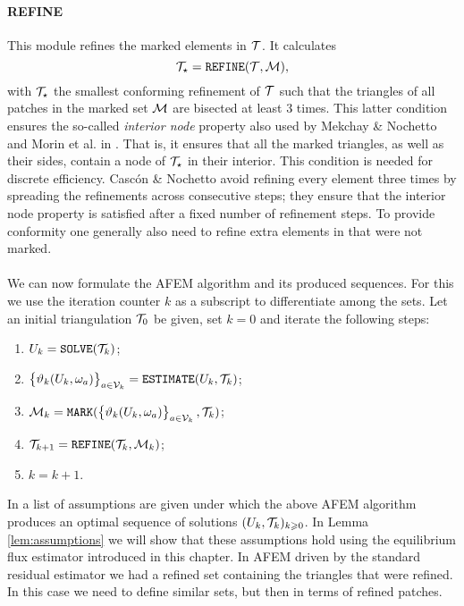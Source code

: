 \documentclass[thesis.tex]{subfiles}
\begin{document}
\paragraph{REFINE}
This module refines the marked elements in $\mathcal{T}$. It calculates
\[
  \mathcal{T}_\star = \texttt{REFINE}(\mathcal{T}, \mathcal{M}),
\]
with $\mathcal{T}_\star$ the smallest conforming refinement of $\mathcal{T}$ such that the triangles of
all patches in the marked set $\mathcal{M}$ are bisected at least 3 times. 
This latter condition ensures the so-called \emph{interior node} property also used by Mekchay \& Nochetto \cite{mekchay2005convergence} and Morin et al. in \cite{morin2002convergence}. That is, it ensures that all the marked triangles, as well as their sides, contain a node of $\mathcal{T}_\star$ in their interior.
This condition is needed for  discrete efficiency. Casc\'on \& Nochetto \cite{cascon2012} avoid
refining every element three times by  spreading the refinements across consecutive steps;
they ensure that the interior node property is satisfied after a fixed number of refinement steps.
To provide conformity one generally also need to refine extra elements in that were not marked.
\\\\
We can now formulate the AFEM algorithm and its produced sequences. For this we use the
iteration counter $k$ as a subscript to differentiate among the sets.
Let an initial triangulation $\mathcal{T}_0$ be given, set $k = 0$ and iterate the following steps:
\begin{enumerate}
\item $U_k = \texttt{SOLVE}(\mathcal{T}_k)$;
\item $\set{\vartheta_k(U_k, \omega_a)}_{a \in \mathcal{V}_k} = \texttt{ESTIMATE}(U_k, \mathcal{T}_k)$;
  \item $\mathcal{M}_k = \texttt{MARK}(\set{\vartheta_k(U_k, \omega_a)}_{a \in \mathcal{V}_k}, \mathcal{T}_k)$;
  \item $\mathcal{T}_{k+1} = \texttt{REFINE}(\mathcal{T}_k, \mathcal{M}_k)$;
  \item $k  = k + 1$.
\end{enumerate}

In \cite[\S 4]{cascon2012} a list of assumptions are given under which the above AFEM algorithm produces
an optimal sequence of solutions $(U_k, \mathcal{T}_k)_{k \geqslant 0}$. In Lemma \ref{lem:assumptions} we will show that these
assumptions hold using the equilibrium flux estimator introduced in this chapter.
In AFEM driven by the standard residual estimator we had a refined set containing the triangles that were refined.
In this case we need to define similar sets, but then in terms of refined patches.
\end{document}
